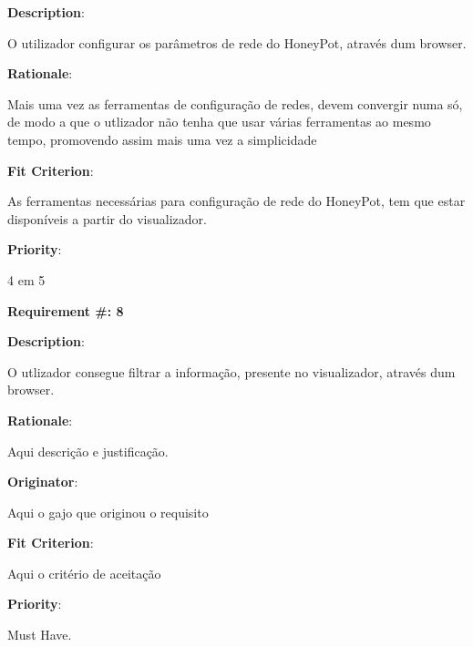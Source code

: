\begin{description}
\item \textbf{Description}:

O utilizador configurar os parâmetros de rede do HoneyPot, através dum browser.

\item \textbf{Rationale}:

Mais uma vez as ferramentas de configuração de redes, devem convergir numa só, de modo a que o utlizador não tenha que usar várias ferramentas
ao mesmo tempo, promovendo assim mais uma vez a simplicidade

\item \textbf{Fit Criterion}:

As ferramentas necessárias para configuração de rede do HoneyPot, tem que estar disponíveis a partir do visualizador.

\item \textbf{Priority}:

4 em 5

\end{description}

\pagebreak






\begin{minipage}{0.55\textwidth}
\begin{flushleft}\textbf{Requirement \#: 8}\end{flushleft}
\end{minipage}
\begin{minipage}{0.4\textwidth}
\end{minipage}

\begin{description}
\item \textbf{Description}:

O utlizador consegue filtrar a informação, presente no visualizador, através dum browser.

\item \textbf{Rationale}:

Aqui descrição e justificação. \\
\item \textbf{Originator}:

Aqui o gajo que originou o requisito\\

\item \textbf{Fit Criterion}:

Aqui o critério de aceitação \\

\item \textbf{Priority}:

Must Have. \\

\end{description}

